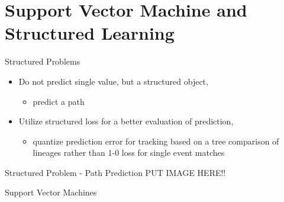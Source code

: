 \section{Support Vector Machine and Structured Learning}

\begin{frame}{Structured Problems}
    \begin{itemize}
          \item Do not predict single value, but a structured object,
        \begin{itemize}
              \item[] \eg predict a path
        \end{itemize}
          \item Utilize structured loss for a better evaluation of prediction, 
        \begin{itemize}
              \item[] \eg quantize prediction error for tracking based on a tree comparison of lineages rather than 1-0 loss for single event matches
        \end{itemize}
    \end{itemize}
\end{frame}


\begin{frame}{Structured Problem - Path Prediction}
    PUT IMAGE HERE!!
\end{frame}


\begin{frame}{Support Vector Machines}
    
\end{frame}


